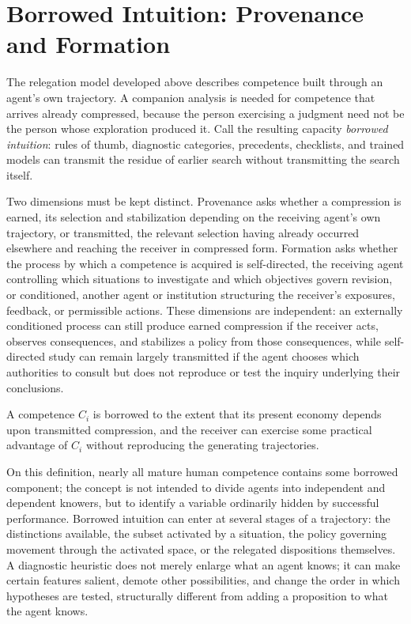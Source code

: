 \section{Borrowed Intuition: Provenance and Formation}

The relegation model developed above describes competence built through an agent's own trajectory. A companion analysis is needed for competence that arrives already compressed, because the person exercising a judgment need not be the person whose exploration produced it. Call the resulting capacity \emph{borrowed intuition}: rules of thumb, diagnostic categories, precedents, checklists, and trained models can transmit the residue of earlier search without transmitting the search itself.

Two dimensions must be kept distinct. Provenance asks whether a compression is earned, its selection and stabilization depending on the receiving agent's own trajectory, or transmitted, the relevant selection having already occurred elsewhere and reaching the receiver in compressed form. Formation asks whether the process by which a competence is acquired is self-directed, the receiving agent controlling which situations to investigate and which objectives govern revision, or conditioned, another agent or institution structuring the receiver's exposures, feedback, or permissible actions. These dimensions are independent: an externally conditioned process can still produce earned compression if the receiver acts, observes consequences, and stabilizes a policy from those consequences, while self-directed study can remain largely transmitted if the agent chooses which authorities to consult but does not reproduce or test the inquiry underlying their conclusions.

\begin{definition}
A competence $C_i$ is borrowed to the extent that its present economy depends upon transmitted compression, and the receiver can exercise some practical advantage of $C_i$ without reproducing the generating trajectories.
\end{definition}

On this definition, nearly all mature human competence contains some borrowed component; the concept is not intended to divide agents into independent and dependent knowers, but to identify a variable ordinarily hidden by successful performance. Borrowed intuition can enter at several stages of a trajectory: the distinctions available, the subset activated by a situation, the policy governing movement through the activated space, or the relegated dispositions themselves. A diagnostic heuristic does not merely enlarge what an agent knows; it can make certain features salient, demote other possibilities, and change the order in which hypotheses are tested, structurally different from adding a proposition to what the agent knows.

